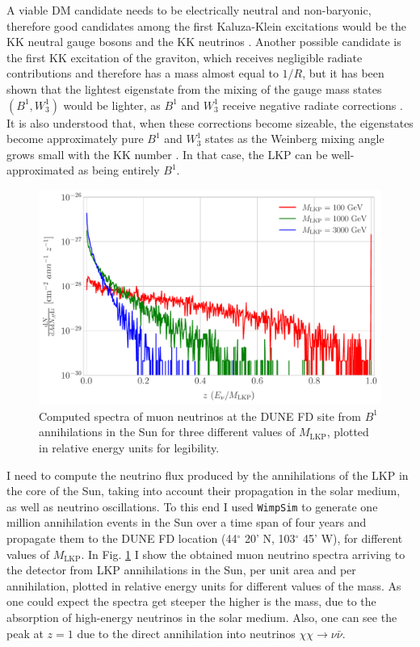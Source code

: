 A viable DM candidate needs to be electrically neutral and non-baryonic, therefore good candidates among the first Kaluza-Klein excitations would be the KK neutral gauge bosons and the KK neutrinos \cite{Servant2002}. Another possible candidate is the first KK excitation of the graviton, which receives negligible radiate contributions and therefore has a mass almost equal to $1/R$, but it has been shown that the lightest eigenstate from the mixing of the gauge mass states $\left(B^{1}, W_{3}^{1}\right)$ would be lighter, as $B^{1}$ and $W_{3}^{1}$ receive negative radiate corrections \cite{Cheng2002}. It is also understood that, when these corrections become sizeable, the eigenstates become approximately pure $B^{1}$ and $W_{3}^{1}$ states as the Weinberg mixing angle grows small with the KK number \cite{Cheng2002}. In that case, the LKP can be well-approximated as being entirely $B^{1}$.

\begin{figure}[t]
	\centering
	\includegraphics[width=0.9\linewidth]{Images/DM_Analysis/KK_nu_flux}
	\caption[Computed spectra of muon neutrinos at the DUNE FD site from $B^{1}$ annihilations in the Sun for various values of $M_{\mathrm{LKP}}$.]{Computed spectra of muon neutrinos at the DUNE FD site from $B^{1}$ annihilations in the Sun for three different values of $M_{\mathrm{LKP}}$, plotted in relative energy units for legibility.}
	\label{fig:KK_nu_flux}
\end{figure}

I need to compute the neutrino flux produced by the annihilations of the LKP in the core of the Sun, taking into account their propagation in the solar medium, as well as neutrino oscillations.  To this end I used \texttt{WimpSim} \cite{Blennow2007, WimpSim} to generate one million annihilation events in the Sun over a time span of four years and propagate them to the DUNE FD location (44$^{\circ} $ 20' N, 103$^{\circ} $ 45' W), for different values of $M_{\mathrm{LKP}}$. In Fig. \ref{fig:KK_nu_flux} I show the obtained muon neutrino spectra arriving to the detector from LKP annihilations in the Sun, per unit area and per annihilation, plotted in relative energy units for different values of the mass. As one could expect the spectra get steeper the higher is the mass, due to the absorption of high-energy neutrinos in the solar medium. Also, one can see  the peak at $z=1$ due to the direct annihilation into neutrinos $\chi \chi \rightarrow \nu \bar{\nu}$.

